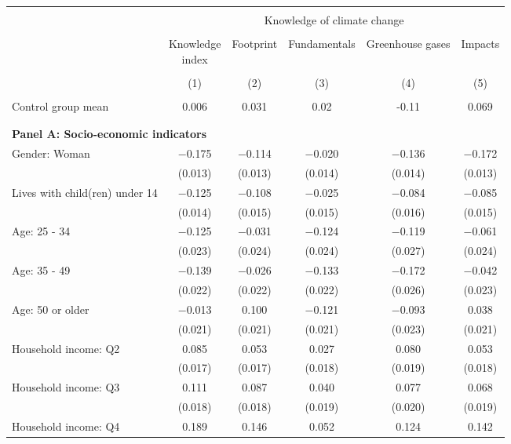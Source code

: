 
\begin{tabular}{@{\extracolsep{5pt}}lccccc} 
\\[-1.8ex]\hline 
\hline \\[-1.8ex] 
 & \multicolumn{5}{c}{Knowledge of climate change} \\ 
\cline{2-6} 
\\[-1.8ex] & \makecell{Knowledge\\index} & Footprint & Fundamentals & Greenhouse gases & Impacts \\ 
\\[-1.8ex] & (1) & (2) & (3) & (4) & (5)\\ 
\hline \\[-1.8ex] 
Control group mean & 0.006 & 0.031 & 0.02 & -0.11 & 0.069  \\ \hline \\[-1.8ex]
\\[1ex]
\multicolumn{ 6 }{l}{\textbf{ Panel A: Socio-economic indicators }} \\
 Gender: Woman & $-$0.175 & $-$0.114 & $-$0.020 & $-$0.136 & $-$0.172 \\ 
  & (0.013) & (0.013) & (0.014) & (0.014) & (0.013) \\ 
  Lives with child(ren) under 14 & $-$0.125 & $-$0.108 & $-$0.025 & $-$0.084 & $-$0.085 \\ 
  & (0.014) & (0.015) & (0.015) & (0.016) & (0.015) \\ 
  Age: 25 - 34 & $-$0.125 & $-$0.031 & $-$0.124 & $-$0.119 & $-$0.061 \\ 
  & (0.023) & (0.024) & (0.024) & (0.027) & (0.024) \\ 
  Age: 35 - 49 & $-$0.139 & $-$0.026 & $-$0.133 & $-$0.172 & $-$0.042 \\ 
  & (0.022) & (0.022) & (0.022) & (0.026) & (0.023) \\ 
  Age: 50 or older & $-$0.013 & 0.100 & $-$0.121 & $-$0.093 & 0.038 \\ 
  & (0.021) & (0.021) & (0.021) & (0.023) & (0.021) \\ 
  Household income: Q2 & 0.085 & 0.053 & 0.027 & 0.080 & 0.053 \\ 
  & (0.017) & (0.017) & (0.018) & (0.019) & (0.018) \\ 
  Household income: Q3 & 0.111 & 0.087 & 0.040 & 0.077 & 0.068 \\ 
  & (0.018) & (0.018) & (0.019) & (0.020) & (0.019) \\ 
  Household income: Q4 & 0.189 & 0.146 & 0.052 & 0.124 & 0.142 \\ 

\end{tabular}
